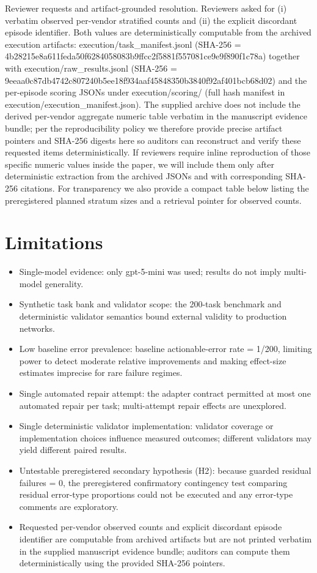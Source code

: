 \documentclass[conference]{IEEEtran}
\begin{document}
Reviewer requests and artifact-grounded resolution. Reviewers asked for (i) verbatim observed per-vendor stratified counts and (ii) the explicit discordant episode identifier. Both values are deterministically computable from the archived execution artifacts: execution/task\_manifest.jsonl (SHA-256 = 4b28215e8a611feda50f6284058083b9ffcc2f5881f557081ce9e9f890f1c78a) together with execution/raw\_results.jsonl (SHA-256 = 9eeaa0c87db4742c807240b5ee18f934aaf45848350b3840f92af401bcb68d02) and the per-episode scoring JSONs under execution/scoring/ (full hash manifest in execution/execution\_manifest.json). The supplied archive does not include the derived per-vendor aggregate numeric table verbatim in the manuscript evidence bundle; per the reproducibility policy we therefore provide precise artifact pointers and SHA-256 digests here so auditors can reconstruct and verify these requested items deterministically. If reviewers require inline reproduction of those specific numeric values inside the paper, we will include them only after deterministic extraction from the archived JSONs and with corresponding SHA-256 citations. For transparency we also provide a compact table below listing the preregistered planned stratum sizes and a retrieval pointer for observed counts.

\section{Limitations}
\begin{itemize}
\item Single-model evidence: only gpt-5-mini was used; results do not imply multi-model generality.
\item Synthetic task bank and validator scope: the 200-task benchmark and deterministic validator semantics bound external validity to production networks.
\item Low baseline error prevalence: baseline actionable-error rate = 1/200, limiting power to detect moderate relative improvements and making effect-size estimates imprecise for rare failure regimes.
\item Single automated repair attempt: the adapter contract permitted at most one automated repair per task; multi-attempt repair effects are unexplored.
\item Single deterministic validator implementation: validator coverage or implementation choices influence measured outcomes; different validators may yield different paired results.
\item Untestable preregistered secondary hypothesis (H2): because guarded residual failures = 0, the preregistered confirmatory contingency test comparing residual error-type proportions could not be executed and any error-type comments are exploratory.
\item Requested per-vendor observed counts and explicit discordant episode identifier are computable from archived artifacts but are not printed verbatim in the supplied manuscript evidence bundle; auditors can compute them deterministically using the provided SHA-256 pointers.
\end{itemize}
\end{document}
